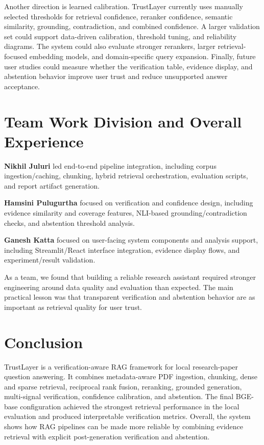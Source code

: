 \documentclass[11pt]{article}
\begin{document}
Another direction is learned calibration. TrustLayer currently uses manually selected thresholds for retrieval confidence, reranker confidence, semantic similarity, grounding, contradiction, and combined confidence. A larger validation set could support data-driven calibration, threshold tuning, and reliability diagrams. The system could also evaluate stronger rerankers, larger retrieval-focused embedding models, and domain-specific query expansion. Finally, future user studies could measure whether the verification table, evidence display, and abstention behavior improve user trust and reduce unsupported answer acceptance.

\section{Team Work Division and Overall Experience}

\noindent\textbf{Nikhil Juluri} led end-to-end pipeline integration, including corpus ingestion/caching, chunking, hybrid retrieval orchestration, evaluation scripts, and report artifact generation.

\vspace{0.35em}
\noindent\textbf{Hamsini Pulugurtha} focused on verification and confidence design, including evidence similarity and coverage features, NLI-based grounding/contradiction checks, and abstention threshold analysis.

\vspace{0.35em}
\noindent\textbf{Ganesh Katta} focused on user-facing system components and analysis support, including Streamlit/React interface integration, evidence display flows, and experiment/result validation.

\vspace{0.35em}
\noindent As a team, we found that building a reliable research assistant required stronger engineering around data quality and evaluation than expected. The main practical lesson was that transparent verification and abstention behavior are as important as retrieval quality for user trust.

\section{Conclusion}

TrustLayer is a verification-aware RAG framework for local research-paper question answering. It combines metadata-aware PDF ingestion, chunking, dense and sparse retrieval, reciprocal rank fusion, reranking, grounded generation, multi-signal verification, confidence calibration, and abstention. The final BGE-base configuration achieved the strongest retrieval performance in the local evaluation and produced interpretable verification metrics. Overall, the system shows how RAG pipelines can be made more reliable by combining evidence retrieval with explicit post-generation verification and abstention.


\end{document}
